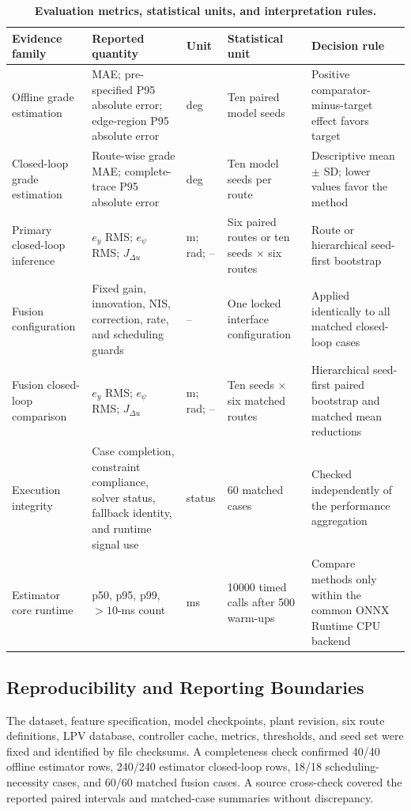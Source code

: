 \documentclass{ieeeaccess}
\begin{document}
\begin{table}[!t]
\centering
\caption{\textbf{Evaluation metrics, statistical units, and interpretation rules.}}
\label{tab:evaluation_protocol}
\scriptsize
\setlength{\tabcolsep}{3.0pt}
\setlength{\tabcolsep}{3pt}
\begin{tabular}{|p{}|p{}|p{}|p{}|p{}|}
\hline
Evidence family & Reported quantity & Unit & Statistical unit & Decision rule \\
\hline
Offline grade estimation & MAE; pre-specified P95 absolute error; edge-region P95 absolute error & deg & Ten paired model seeds & Positive comparator-minus-target effect favors target \\
Closed-loop grade estimation & Route-wise grade MAE; complete-trace P95 absolute error & deg & Ten model seeds per route & Descriptive mean $\pm$ SD; lower values favor the method \\
Primary closed-loop inference & $e_y$ RMS; $e_\psi$ RMS; $J_{\Delta u}$ & m; rad; -- & Six paired routes or ten seeds $\times$ six routes & Route or hierarchical seed-first bootstrap \\
Fusion configuration & Fixed gain, innovation, NIS, correction, rate, and scheduling guards & -- & One locked interface configuration & Applied identically to all matched closed-loop cases \\
Fusion closed-loop comparison & $e_y$ RMS; $e_\psi$ RMS; $J_{\Delta u}$ & m; rad; -- & Ten seeds $\times$ six matched routes & Hierarchical seed-first paired bootstrap and matched mean reductions \\
Execution integrity & Case completion, constraint compliance, solver status, fallback identity, and runtime signal use & status & 60 matched cases & Checked independently of the performance aggregation \\
Estimator core runtime & p50, p95, p99, $>10$-ms count & ms & 10000 timed calls after 500 warm-ups & Compare methods only within the common ONNX Runtime CPU backend \\
\hline
\end{tabular}
\end{table}

\subsection{Reproducibility and Reporting Boundaries}

The dataset, feature specification, model checkpoints, plant revision, six route definitions, LPV database, controller cache, metrics, thresholds, and seed set were fixed and identified by file checksums. A completeness check confirmed 40/40 offline estimator rows, 240/240 estimator closed-loop rows, 18/18 scheduling-necessity cases, and 60/60 matched fusion cases. A source cross-check covered the reported paired intervals and matched-case summaries without discrepancy.
\end{document}
